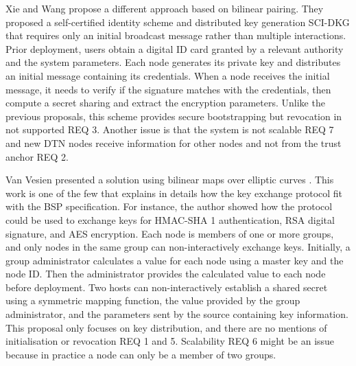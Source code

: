 Xie and Wang \cite{xie2013practical} propose a different approach based on bilinear pairing. They proposed a self-certified identity scheme and distributed key generation SCI-DKG that requires only an initial broadcast message rather than multiple interactions. Prior deployment, users obtain a digital ID card granted by a relevant authority and the system parameters. Each node generates its private key and distributes an initial message containing its credentials. When a node receives the initial message, it needs to verify if the signature matches with the credentials, then compute a secret sharing and extract the encryption parameters. Unlike the previous proposals, this scheme provides secure bootstrapping but revocation in not supported REQ 3. Another issue is that the system is not scalable REQ 7 and new DTN nodes receive information for other nodes and not from the trust anchor REQ 2.

Van Vesien presented a solution using bilinear maps over elliptic curves \cite{van2010dynamic}. This work is one of the few that explains in details how the key exchange protocol fit with the BSP specification. For instance, the author showed how the protocol could be used to exchange keys for HMAC-SHA 1 authentication, RSA digital signature, and AES encryption. Each node is members of one or more groups, and only nodes in the same group can non-interactively exchange keys. Initially, a group administrator calculates a value for each node using a master key and the node ID.  Then the administrator provides the calculated value to each node before deployment. Two hosts can non-interactively establish a shared secret using a symmetric mapping function, the value provided by the group administrator, and the parameters sent by the source containing key information. This proposal only focuses on key distribution, and there are no mentions of initialisation or revocation REQ 1 and 5. Scalability REQ 6 might be an issue because in practice a node can only be a member of two groups.



